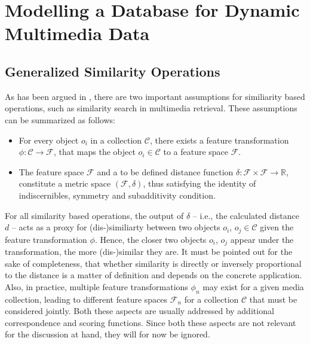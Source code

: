 \chapter{Modelling a Database for Dynamic Multimedia Data}
\label{chapter:system_model}


\section{Generalized Similarity Operations}

As has been argued in , there are two important assumptions for similiarity based operations, such as similarity search in multimedia retrieval. These assumptions can be summarized as follows:

\begin{itemize}
    \item For every object $o_{i}$ in a collection $\mathcal{C}$, there exists a feature transformation $\phi \colon \mathcal{C} \to \mathcal{F}$, that maps the object $o_{i} \in \mathcal{C}$ to a feature space $\mathcal{F}$.
    \item The feature space $\mathcal{F}$ and a to be defined distance function $\delta \colon \mathcal{F} \times \mathcal{F} \to \mathbb{R}$, constitute a metric space $(\mathcal{F},\delta)$, thus satisfying the identity of indiscernibles, symmetry and subadditivity condition.
\end{itemize}

For all similarity based operations, the output of $\delta$ -- i.e., the calculated distance $d$ -- acts as a proxy for (dis-)similiarty between two objects $o_{i}$, $o_{j} \in \mathcal{C}$ given the feature transformation $\phi$. Hence, the closer two objects $o_{i}$, $o_{j}$ appear under the transformation, the more (dis-)similar they are. It must be pointed out for the sake of completeness, that whether similarity is directly or inversely proportional to the distance is a matter of definition and depends on the concrete application. Also, in practice, multiple feature transformations $\phi_n$ may exist for a given media collection, leading to different feature spaces $\mathcal{F}_n$ for a collection $\mathcal{C}$ that must be considered jointly. Both these aspects are usually addressed by additional correspondence and scoring functions. Since both these aspects are not relevant for the discussion at hand, they will for now be ignored.


